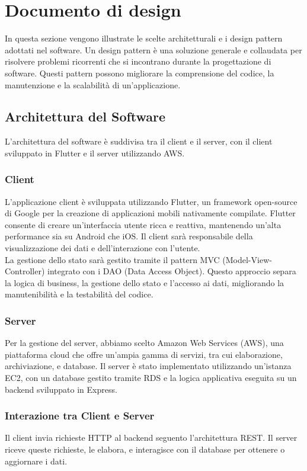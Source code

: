 \chapter{Documento di design}
In questa sezione vengono illustrate le scelte architetturali e i design pattern adottati nel software.
Un design pattern è una soluzione generale e collaudata per risolvere problemi ricorrenti che si incontrano durante la progettazione di software.
Questi pattern possono migliorare la comprensione del codice, la manutenzione e la scalabilità di un'applicazione.

\bigskip\bigskip

\section{Architettura del Software}
L'architettura del software è suddivisa tra il client e il server, con il client sviluppato in Flutter e il server utilizzando AWS.

\subsection{Client}
L'applicazione client è sviluppata utilizzando Flutter, un framework open-source di Google per la creazione di applicazioni mobili nativamente compilate. Flutter consente di creare un'interfaccia utente ricca e reattiva, mantenendo un'alta performance sia su Android che iOS.\meskip
Il client sarà responsabile della visualizzazione dei dati e dell'interazione con l'utente.\\
La gestione dello stato sarà gestito tramite il pattern MVC (Model-View-Controller) integrato con i DAO (Data Access Object). 
Questo approccio separa la logica di business, la gestione dello stato e l'accesso ai dati, migliorando la manutenibilità e la testabilità del codice.

\subsection{Server}
Per la gestione del server, abbiamo scelto Amazon Web Services (AWS), una piattaforma cloud che offre un'ampia gamma di servizi, tra cui elaborazione, archiviazione, e database. 
Il server è stato implementato utilizzando un'istanza EC2, con un database gestito tramite RDS e la logica applicativa eseguita su un backend sviluppato in Express.


\subsection{Interazione tra Client e Server}
Il client invia richieste HTTP al backend seguento l'architettura REST. Il server riceve queste richieste, le elabora, e interagisce con il database per ottenere o aggiornare i dati.

